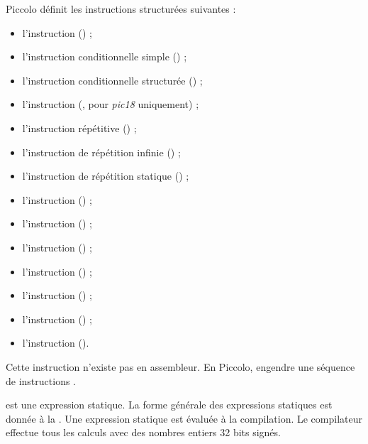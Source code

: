 Piccolo définit les instructions structurées suivantes :
\begin{itemize}
  \item l'instruction  () ;
  \item l'instruction conditionnelle simple () ;
  \item l'instruction conditionnelle structurée () ;
  \item l'instruction  (, pour \emph{pic18} uniquement) ;
  \item l'instruction répétitive () ;
  \item l'instruction de répétition infinie () ;
  \item l'instruction de répétition statique () ;
  \item l'instruction  () ;
  \item l'instruction  () ;
  \item l'instruction  () ;
  \item l'instruction  () ;
  \item l'instruction  () ;
  \item l'instruction  () ;
  \item l'instruction  ().
\end{itemize}


Cette instruction n'existe pas en assembleur. En Piccolo,  engendre une séquence de  instructions .

 est une expression statique. La forme générale des expressions statiques est donnée à la . Une expression statique est évaluée à la compilation. Le compilateur effectue tous les calculs avec des nombres entiers 32 bits signés.





